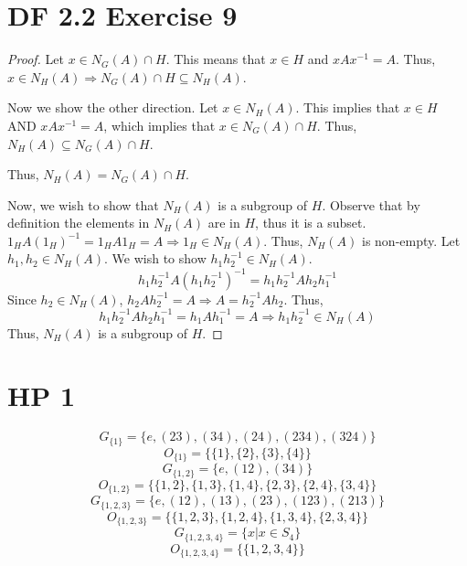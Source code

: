 \documentclass{article}
\begin{document}
\section{DF 2.2 Exercise 9}
\begin{proof}
Let $x \in N_G(A) \cap H$. This means that $x \in H$ and $xAx^{-1}=A$. Thus, $x \in N_H(A) \Rightarrow N_G(A)\cap H \subseteq N_H(A)$. 

Now we show the other direction. Let $x \in N_H(A)$. This implies that $x \in H$ AND $xAx^{-1}=A$, which implies that $x \in N_G(A) \cap H$. Thus, $N_H(A) \subseteq N_G(A)\cap H$.

Thus, $N_H(A) = N_G(A)\cap H$.

Now, we wish to show that $N_H(A)$ is a subgroup of $H$. Observe that by definition the elements in $N_H(A)$ are in $H$, thus it is a subset. $1_HA(1_H)^{-1}=1_HA1_H=A \Rightarrow 1_H \in N_H(A)$. Thus, $N_H(A)$ is non-empty. Let $h_1, h_2 \in N_H(A)$. We wish to show $h_1h_2^{-1} \in N_H(A)$. 
\[
h_1h_2^{-1}A(h_1h_2^{-1})^{-1} = h_1h_2^{-1}Ah_2h_1^{-1}
\]
Since $h_2 \in N_H(A)$, $h_2Ah_2^{-1}=A \Rightarrow A=h_2^{-1}Ah_2$. Thus,
\[
h_1h_2^{-1}Ah_2h_1^{-1}=h_1Ah_1^{-1}=A \Rightarrow h_1h_2^{-1} \in N_H(A)
\]
Thus, $N_H(A)$ is a subgroup of $H$.
\end{proof}

\section{HP 1}
\[
G_{\{1\}} = \{e, (23),(34),(24),(234),(324)\}
\]
\[
O_{\{1\}} = \{\{1\},\{2\},\{3\},\{4\}\}
\]
\[
G_{\{1,2\}} = \{e, (12), (34)\}
\]
\[
O_{\{1,2\}} = \{\{1,2\},\{1,3\},\{1,4\},\{2,3\},\{2,4\},\{3,4\}\}
\]
\[
G_{\{1,2,3\}} = \{e, (12), (13), (23), (123),(213)\}
\]
\[
O_{\{1,2,3\}} = \{\{1,2,3\},\{1,2,4\},\{1,3,4\},\{2,3,4\}\}
\]
\[
G_{\{1,2,3,4\}} = \{x|x \in S_4\}
\]
\[
O_{\{1,2,3,4\}} = \{\{1,2,3,4\}\}
\]
\end{document}
